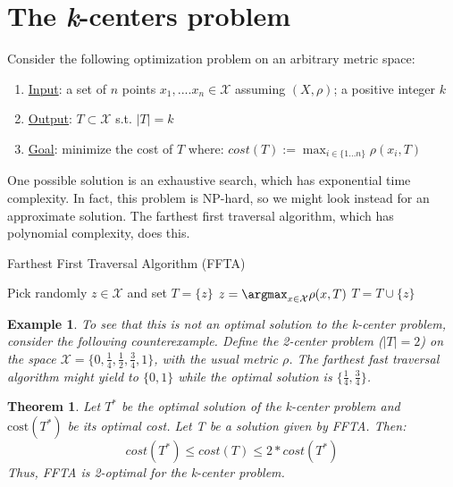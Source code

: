 \documentclass{article}
\newtheorem{theorem}{Theorem}
\newtheorem{example}{Example}
\begin{document}
\section{The \emph{k}-centers problem}
Consider the following optimization problem on an arbitrary metric
space:
\begin{enumerate}
\item \underline{Input}: a set of $n$ points $x_1,....x_n \in 
\mathcal{X}$ assuming $(X,\rho)$; a positive integer $k$ 
\item \underline{Output}: $T \subset \mathcal{X}$ s.t. $|T| = k$
\item \underline{Goal}: minimize the cost of $T$ where: $ cost(T)
:= \max_{i \in \{1...n\}} \rho(x_i,T) $
\end{enumerate}

One possible solution is an exhaustive search, which has exponential
time complexity. In fact, this problem is NP-hard, so we might look
instead for an approximate solution. The farthest first traversal
algorithm, which has polynomial complexity, does this.

\begin{algorithm}
\caption{Farthest First Traversal Algorithm (FFTA)}
\begin{algorithmic} 
\STATE Pick randomly $z\in \mathcal{X}$ and set $T = \{z\}$\;
\STATE $z = \argmax_{x\in \mathcal{X}} \rho(x,T)$ \;
\STATE $T = T \cup \{z\}$\;
\ENDWHILE
\end{algorithmic}
\end{algorithm}

\begin{example}
To see that this is not an optimal solution to the k-center problem,
consider the following counterexample. Define the 2-center problem
($|T| = 2$) on the space $\mathcal{X} = \{0, \frac{1}{4}, \frac{1}{2},
\frac{3}{4}, 1\}$, with the usual metric $\rho$. The farthest fast
traversal algorithm might yield to  $\{0,1\}$ while the optimal
solution is $\{\frac{1}{4},\frac{3}{4}\}$.
\end{example}

\begin{theorem}
Let $T^*$ be the optimal solution of the k-center problem and
$\mathrm{cost}(T^*)$ be its optimal cost. Let T be a solution given
by FFTA. Then: 
\[cost(T^*) \le cost(T) \le 2 * cost(T^*)\]
Thus, FFTA is 2-optimal for the k-center problem. 
\end{theorem} 
\end{document}
